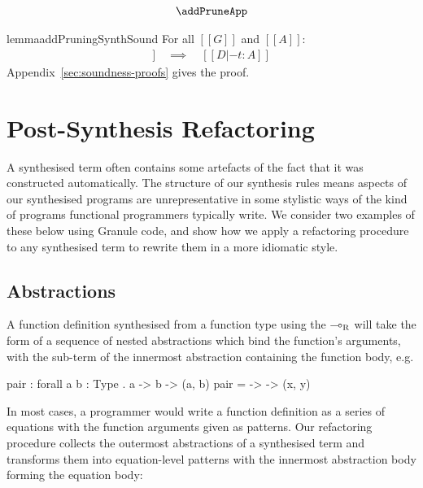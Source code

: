 \begin{align*}
  \begin{array}{c}
    \addPruneApp
  \end{array}
\end{align*}

\begin{restatable}{lemma}{addPruningSynthSound}
\label{lemma:addPruningSynthSound} For all $[[ G ]]$ and $[[ A ]]$:
%
\begin{align*}
[[ G |- A =>+ t ; D ]] \quad \implies \quad [[ D |- t : A ]]
\end{align*}
Appendix~\ref{sec:soundness-proofs} gives the proof.
\end{restatable}


\section{Post-Synthesis Refactoring}
\label{sec:linear-base-refactoring}
A synthesised term often contains some artefacts of the fact that it was
constructed automatically. The structure of our synthesis rules means aspects of
our synthesised programs are unrepresentative in some stylistic ways of the kind
of programs functional programmers typically write. We consider two examples
of these below using Granule code, and show how we apply a refactoring procedure to any synthesised
term to rewrite them in a more idiomatic style. 

\subsection{Abstractions}
A function definition synthesised from a function type using the
$\multimap_{\textsc{R}}$ will take the form of a sequence of nested abstractions which
bind the function's arguments, with the sub-term of the innermost abstraction
containing the function body, e.g.

\begin{granule}
pair : forall {a b : Type} . a -> b -> (a, b)
pair = \x -> \y -> (x, y)
\end{granule}

In most cases, a programmer would write a function definition as a series of
equations with the function arguments given as patterns. Our refactoring
procedure collects the outermost abstractions of a synthesised term and
transforms them into equation-level patterns with the innermost abstraction
body forming the equation body:

